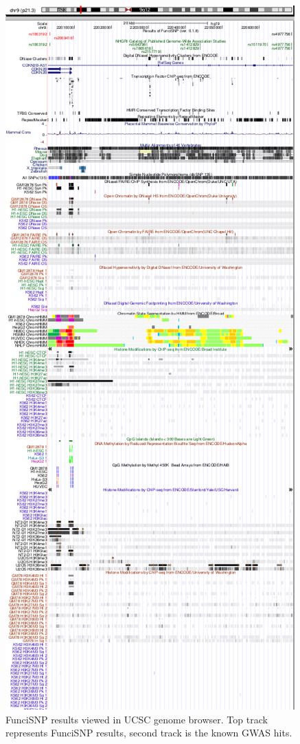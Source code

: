 \documentclass[12pt,fullpage]{article}
\begin{document}
\begin{figure}[ht!]                                                              
\begin{center}                                                                   
\includegraphics{UCSC_genomeviewer_glioma.png}                                    
\caption{\label{fig:FunciSNP_genome_viewer1.pdf} FunciSNP results viewed in UCSC
genome browser. Top track represents FunciSNP results, second track is the known
GWAS hits.}        
{\footnotesize{}}                                                                
\end{center}                                                                     
\end{figure}
\end{document}
